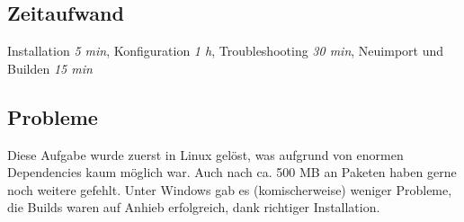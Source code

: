 \documentclass[letterpaper, 12pt]{article}
\let\tempsubsection\subsection
\renewcommand\subsection[1]{\vspace{0cm}\tempsubsection{#1}\vspace{0cm}}
\begin{document}
\subsection{Zeitaufwand}

Installation \textit{5 min}, Konfiguration \textit{1 h}, Troubleshooting \textit{30 min}, Neuimport und Builden \textit{15 min}

\subsection{Probleme}

Diese Aufgabe wurde zuerst in Linux gelöst, was aufgrund von enormen Dependencies kaum möglich war. Auch nach ca. 500 MB an Paketen haben gerne noch weitere gefehlt. Unter Windows gab es (komischerweise) weniger Probleme, die Builds waren auf Anhieb erfolgreich, dank richtiger Installation.

\clearpage



\lstlistoflistings
\listoffigures
\end{document}
